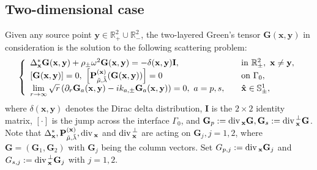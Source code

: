 \documentclass[final,reqno]{siamltex}
\newcommand{\om}{\omega}
\newcommand{\pa}{\partial}
\newcommand{\dive}{{\rm div\,}}
\newcommand{\mat}{\mathbb}
\newcommand{\R}{{\mat R}}
\newcommand{\Sp}{{\mat S}}
\newcommand{\be}{\begin{eqnarray}}
\newcommand{\en}{\end{eqnarray}}
\begin{document}
\subsection{Two-dimensional case}\label{sec3.1}
\setcounter{equation}{0}
Given any source point $\mathbf{y}\in\R^2_+\cup\R^2_-$, the two-layered Green's tensor $\mathbf{G}(\mathbf{x},\mathbf{y})$ in consideration is the solution to the following scattering problem: 
\be\label{3.1}
  \left\{
  \begin{array}{ll}
  	\Delta^*_{\mathbf{x}}\mathbf{G}(\mathbf{x},\mathbf{y})+\rho_\pm\om^2\mathbf{G}(\mathbf{x},\mathbf{y})=-\delta(\mathbf{x},\mathbf{y})\mathbf{I},~~~&{\rm in}~\R^2_\pm,~\mathbf{x}\neq\mathbf{y}, \\
  	\left[\mathbf{G}(\mathbf{x},\mathbf{y})\right]=0,~\left[\mathbf{P}_{\tilde{\mu},\tilde{\lambda}}^{(\mathbf{x})}(\mathbf{G}(\mathbf{x},\mathbf{y}))\right]=0~~~&{\rm on}~\Gamma_0, \\
  	\lim\limits_{r\rightarrow\infty}\sqrt{r}\left(\pa_r\mathbf{G}_a(\mathbf{x},\mathbf{y})-ik_{a,\pm}\mathbf{G}_a(\mathbf{x},\mathbf{y})\right)=0,~a=p,s,~~~&\mathbf{\hat x}\in\Sp^1_\pm, 
  \end{array}
  \right.
\en
where $\delta(\mathbf{x},\mathbf{y})$ denotes the Dirac delta distribution, $\mathbf{I}$ is the $2\times2$ identity matrix, $[\cdot]$ is the jump across the interface $\Gamma_0$, and $\mathbf{G}_p:=\dive_{\mathbf{x}}\mathbf{G}, \mathbf{G}_s:=\dive^\perp_{\mathbf{x}}\mathbf{G}$. Note that $\Delta^*_{\mathbf{x}}, \mathbf{P}_{\tilde{\mu},\tilde{\lambda}}^{(\mathbf{x})},\dive_{\mathbf{x}}$ and $\dive_{\mathbf{x}}^\perp$ are acting on $\mathbf{G}_j, j=1,2$, where $\mathbf{G}=(\mathbf{G}_1,\mathbf{G}_2)$ with $\mathbf{G}_j$ being the column vectors. Set $G_{p,j}:=\dive_{\mathbf{x}}\mathbf{G}_j$ and $G_{s,j}:=\dive_{\mathbf{x}}^\perp\mathbf{G}_j$ with $j=1,2$. 
\end{document}
